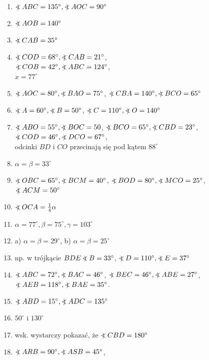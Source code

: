 \documentclass[10pt]{article}
\newcommand\Varangle{\mathop{{<\!\!\!\!\!\text{\small)}}\:}\nolimits}
\begin{document}
\begin{enumerate}
  \item \(\Varangle A B C=135^{\circ}, \Varangle A O C=90^{\circ}\)
  \item \(\Varangle A O B=140^{\circ}\)
  \item \(\Varangle C A B=35^{\circ}\)
  \item \(\Varangle C O D=68^{\circ}, \Varangle C A B=21^{\circ}\),\\
\(\Varangle C O B=42^{\circ}, \Varangle A B C=124^{\circ}\),\\
\(x=77^{\circ}\)
  \item \(\Varangle A O C=80^{\circ}, \Varangle B A O=75^{\circ}\), \(\Varangle C B A=140^{\circ}, \Varangle B C O=65^{\circ}\)
  \item \(\Varangle A=60^{\circ}, \Varangle B=50^{\circ}\), \(\Varangle C=110^{\circ}, \Varangle O=140^{\circ}\)
  \item \(\Varangle A B O=55^{\circ}, \Varangle B O C=50\), \(\Varangle B C O=65^{\circ}, \Varangle C B D=23^{\circ}\), \(\Varangle C O D=46^{\circ}, \Varangle D C O=67^{\circ}\),\\
odcinki \(B D\) i \(C O\) przecinają się pod kątem \(88^{\circ}\)
  \item \(\alpha=\beta=33^{\circ}\)
  \item \(\Varangle O B C=65^{\circ}, \Varangle B C M=40^{\circ}\), \(\Varangle B O D=80^{\circ}, \Varangle M C O=25^{\circ}\),\\
\(\Varangle A C M=50^{\circ}\)
  \item \(\Varangle O C A=\frac{1}{4} \alpha\)
  \item \(\alpha=77^{\circ}, \beta=75^{\circ}, \gamma=103^{\circ}\)
  \item a) \(\alpha=\beta=29^{\circ}\), b) \(\alpha=\beta=25^{\circ}\)
  \item np. w trójkącie \(B D E \Varangle B=33^{\circ}\), \(\Varangle D=110^{\circ}, \Varangle E=37^{\circ}\)
  \item \(\Varangle A B C=72^{\circ}, \Varangle B A C=46^{\circ}\), \(\Varangle B E C=46^{\circ}, \Varangle A B E=27^{\circ}\), \(\Varangle A E B=118^{\circ}, \Varangle B A E=35^{\circ}\).
  \item \(\Varangle A B D=15^{\circ}, \Varangle A D C=135^{\circ}\)
  \item \(50^{\circ}\) i \(130^{\circ}\)
  \item wsk. wystarczy pokazać, że \(\Varangle C B D=180^{\circ}\)
  \item \(\Varangle A R B=90^{\circ}, \Varangle A S B=45^{\circ}\),\\

\end{enumerate}
\end{document}
